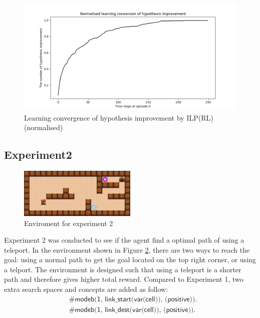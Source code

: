 \begin{figure}[!htb]
\centering
\includegraphics[width=1.0\textwidth]{./figures/experiment1_ilasp}
\caption{Learning convergence of hypothesis improvement by ILP(RL) (normalised)}
\label{experiment1_ilasp}
\end{figure}

\newpage
\subsection{Experiment2}

\begin{figure}[!htb]
\centering
\includegraphics[width=0.5\textwidth]{./figures/experiment3}
\caption{Enviroment for experiment 2}
\label{experiment3}
\end{figure}

Experiment 2 was conducted to see if the agent find a optimal path of using a teleport. In the environment shown in Figure \ref{experiment3},
there are two ways to reach the goal: using a normal path to get the goal located on the top right corner, or using a telport.
The environment is designed such that using a teleport is a shorter path and therefore gives higher total reward.
Compared to Experiment 1, two extra search spaces and concepts are added as follow:
\begin{equation*}
\begin{split}
&\textsf{\#modeb(1, link\_start(var(cell)), (positive)).}\\
&\textsf{\#modeb(1, link\_dest(var(cell)), (positive)).}
\end{split}
\end{equation*}

